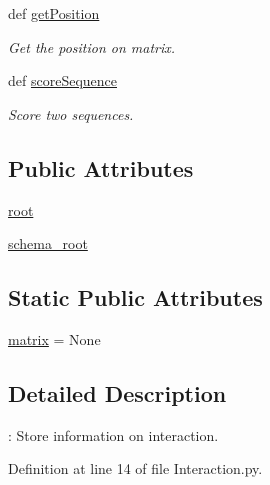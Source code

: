 \begin{DoxyCompactItemize}
def \hyperlink{classirna_1_1iRNA__pred_1_1Interaction_1_1Interaction_a3b615501e2b17a5300eea3f468b071a8}{get\-Position}
\begin{DoxyCompactList}\small\item\em \-Get the position on matrix. \end{DoxyCompactList}\item 
def \hyperlink{classirna_1_1iRNA__pred_1_1Interaction_1_1Interaction_abae08ef3e2657d3cb85e7660a32d953a}{score\-Sequence}
\begin{DoxyCompactList}\small\item\em \-Score two sequences. \end{DoxyCompactList}\end{DoxyCompactItemize}
\subsection*{\-Public \-Attributes}
\begin{DoxyCompactItemize}
\item 
\hyperlink{classirna_1_1iRNA__pred_1_1Interaction_1_1Interaction_a308dbd425c938a70e8be3acae4cf4f56}{root}
\item 
\hyperlink{classirna_1_1iRNA__pred_1_1Interaction_1_1Interaction_aff10b76c7d1f1fcc1b0e9a07e841121c}{schema\-\_\-root}
\end{DoxyCompactItemize}
\subsection*{\-Static \-Public \-Attributes}
\begin{DoxyCompactItemize}
\item 
\hyperlink{classirna_1_1iRNA__pred_1_1Interaction_1_1Interaction_a825e3b61f3feb58b81ae9a7f448db59e}{matrix} = \-None
\end{DoxyCompactItemize}


\subsection{\-Detailed \-Description}
\-: \-Store information on interaction. 

\-Definition at line 14 of file \-Interaction.\-py.




